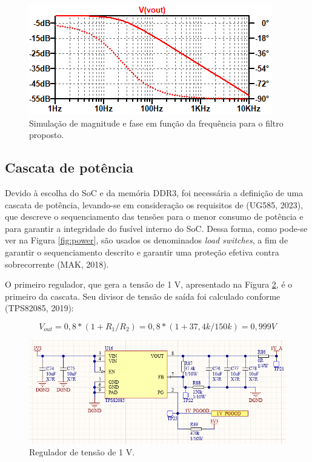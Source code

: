 \begin{figure}[H]
    \centering
    \includegraphics[scale=1]{images/filtrof.png}
    \caption{Simulação de magnitude e fase em função da frequência para o filtro proposto.}
    \label{fig:filtrof}
\end{figure}

\subsection{Cascata de potência}

Devido à escolha do SoC e da memória DDR3, foi necessária a definição de uma cascata de potência, levando-se em consideração os requisitos de (UG585, 2023), que descreve o sequenciamento das tensões para o menor consumo de potência e para garantir a integridade do fusível interno do SoC. Dessa forma, como pode-se ver na Figura \ref{fig:power}, são usados os denominados \textit{load switches}, a fim de garantir o sequenciamento descrito e garantir uma proteção efetiva contra sobrecorrente (MAK, 2018). 

O primeiro regulador, que gera a tensão de 1 V, apresentado na Figura \ref{fig:1vsupp}, é o primeiro da cascata. Seu divisor de tensão de saída foi calculado conforme (TPS82085, 2019):

\begin{equation}
	V_{out} = 0,8 * (1 + R_1/R_2) = 0,8 * (1+ 37,4k/150k) = 0,999 V
\end{equation} 

\begin{figure}[H]
    \centering
    \includegraphics[scale=0.8]{images/1vsupp.png}
    \caption{Regulador de tensão de 1 V.}
    \label{fig:1vsupp}
\end{figure}

